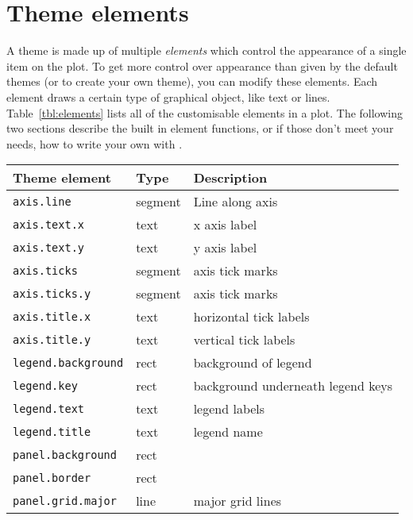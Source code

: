 \section{Theme elements}
\label{sec:theme_elements}

A theme is made up of multiple \emph{elements} which control the appearance of a single item on the plot.  To get more control over appearance than given by the default themes (or to create your own theme), you can modify these elements.  Each element draws a certain type of graphical object, like text or lines. Table~\ref{tbl:elements} lists all of the customisable elements in a plot. The following two sections describe the built in element functions, or if those don't meet your needs, how to write your own with .


\begin{table}
  \begin{center}
  \begin{tabular}{lll}\\
    \toprule
    Theme element              & Type     & Description  \\
    \midrule                              
    \texttt{axis.line}         & segment  & Line along axis  \\
    \texttt{axis.text.x}       & text     & x axis label  \\
    \texttt{axis.text.y}       & text     & y axis label  \\
    \texttt{axis.ticks}        & segment  & axis tick marks  \\
    \texttt{axis.ticks.y}      & segment  & axis tick marks  \\
    \texttt{axis.title.x}      & text     & horizontal tick labels  \\
    \texttt{axis.title.y}      & text     & vertical tick labels  \\[0.5em]
    \texttt{legend.background} & rect     & background of legend  \\
    \texttt{legend.key}        & rect     & background underneath legend keys \\
    \texttt{legend.text}       & text     & legend labels  \\
    \texttt{legend.title}      & text     & legend name  \\[0.5em]
    \texttt{panel.background}  & rect     &   \\
    \texttt{panel.border}      & rect     &   \\
    \texttt{panel.grid.major}  & line     & major grid lines \\

\end{tabular}
\end{center}
\end{table}
